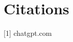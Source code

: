\documentclass[11pt]{article}
\begin{document}








\newpage
\section{Citations}
[1] chatgpt.com
\end{document}
